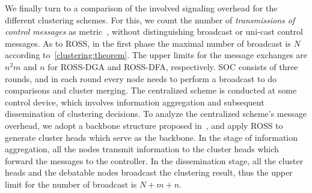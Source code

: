 \documentclass[times]{ettauth}
\theoremstyle{mytheoremstyle}
\theoremstyle{mytheoremstyle}
\theoremstyle{mytheoremstyle}
\begin{document}
We finally turn to a comparison of the involved signaling overhead for the different clustering schemes.
For this, we count the number of \textit{transmissions of control messages} as metric~\cite{complexity_aggregation_2011}, without distinguishing broadcast or uni-cast control messages.
As to ROSS, in the first phase the maximal number of broadcast is $N$ according to~\ref{clustering:theorem}.
The upper limits for the message exchanges are $n^2m$ and $n$ for ROSS-DGA and ROSS-DFA, respectively.
SOC consists of three rounds, and in each round every node needs to perform a broadcast to do comparisons and cluster merging.
The centralized scheme is conducted at some control device, which involves information aggregation and subsequent dissemination of clustering decisions.
To analyze the centralized scheme's message overhead, we adopt a backbone structure proposed in~\cite{Efficient_broadcasting_gathering_adhoc}, and apply ROSS to generate cluster heads which serve as the backbone.
In the stage of information aggregation, all the nodes transmit information to the cluster heads which forward the messages to the controller. 
In the dissemination stage, all the cluster heads and the debatable nodes broadcast the clustering result, thus the upper limit for the number of broadcast is $N+m+n$.
\end{document}

